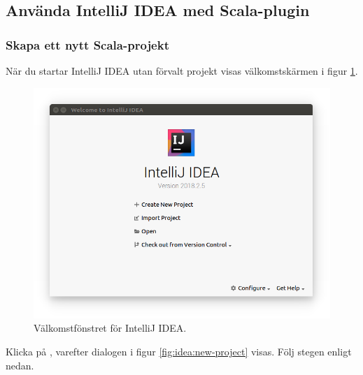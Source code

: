 \subsection{Använda IntelliJ IDEA med Scala-plugin}%

\subsubsection{Skapa ett nytt Scala-projekt}

När du startar IntelliJ IDEA utan förvalt projekt visas välkomstskärmen i figur \ref{fig:idea:welcome}.
\begin{figure}[H]
\centering
\includegraphics[width=1.0\textwidth]{../img/intellij/idea-welcome.png}
\caption{Välkomstfönstret för IntelliJ IDEA. \label{fig:idea:welcome}}
\end{figure}

\noindent Klicka på , varefter dialogen i figur \ref{fig:idea:new-project} visas. Följ stegen enligt nedan.


